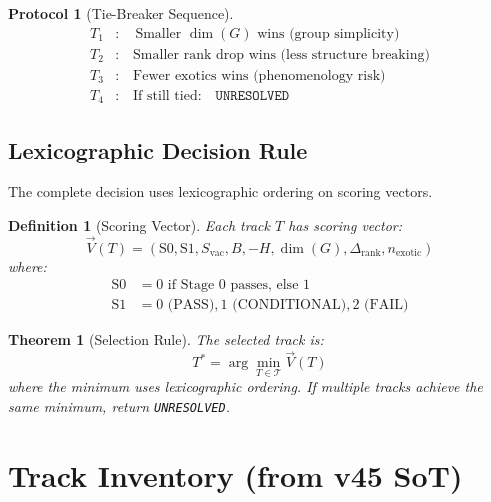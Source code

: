 \documentclass[11pt,a4paper]{article}
\newtheorem{definition}{Definition}[section]
\newtheorem{theorem}{Theorem}[section]
\newtheorem{protocol}{Protocol}[section]
\begin{document}
\begin{protocol}[Tie-Breaker Sequence]
\label{prot:tiebreakers}
\begin{align}
\label{eq:tb-t1}
T_1&: \quad \text{Smaller } \dim(G) \text{ wins (group simplicity)} \\
\label{eq:tb-t2}
T_2&: \quad \text{Smaller rank drop wins (less structure breaking)} \\
\label{eq:tb-t3}
T_3&: \quad \text{Fewer exotics wins (phenomenology risk)} \\
\label{eq:tb-t4}
T_4&: \quad \text{If still tied:} \quad \texttt{UNRESOLVED}
\end{align}
\end{protocol}

\subsection{Lexicographic Decision Rule}
\label{subsec:lexicographic}

The complete decision uses lexicographic ordering on scoring vectors.

\begin{definition}[Scoring Vector]
\label{def:scoring-vector}
Each track $T$ has scoring vector:
\begin{equation}
\label{eq:scoring-vector}
\vec{V}(T) = \left(\text{S0}, \text{S1}, S_{\text{vac}}, B, -H, \dim(G), \Delta_{\text{rank}}, n_{\text{exotic}}\right)
\end{equation}
where:
\begin{align}
\label{eq:sv-s0}
\text{S0} &= 0 \text{ if Stage 0 passes, else } 1 \\
\label{eq:sv-s1}
\text{S1} &= 0 \text{ (PASS)}, 1 \text{ (CONDITIONAL)}, 2 \text{ (FAIL)}
\end{align}
\end{definition}

\begin{theorem}[Selection Rule]
\label{thm:selection}
The selected track is:
\begin{equation}
\label{eq:selection-rule}
T^* = \arg\min_{T \in \mathcal{T}} \vec{V}(T)
\end{equation}
where the minimum uses lexicographic ordering. If multiple tracks achieve
the same minimum, return \texttt{UNRESOLVED}.
\end{theorem}

\section{Track Inventory (from v45 SoT)}
\label{sec:inventory}
\end{document}
